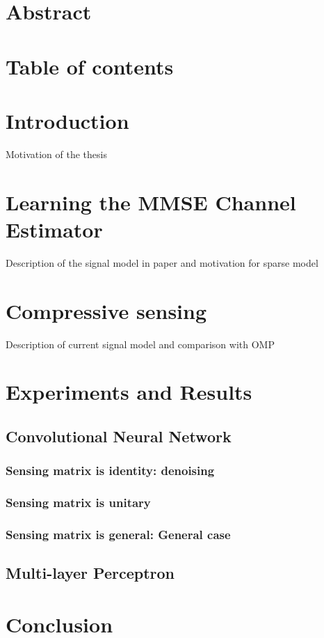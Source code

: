 \documentclass[a4paper,conference]{IEEEtran}
\begin{document}

\section{Abstract}
\section{Table of contents}
\section{Introduction}
Motivation of the thesis
\section{Learning the MMSE Channel Estimator}
Description of the signal model in paper and motivation for sparse model
\section{Compressive sensing}
Description of current signal model and comparison with OMP
\section{Experiments and Results}
\subsection{Convolutional Neural Network}
\subsubsection{Sensing matrix is identity: denoising}
\subsubsection{Sensing matrix is unitary}
\subsubsection{Sensing matrix is general: General case}
\subsection{Multi-layer Perceptron}
\section{Conclusion}
\end{document}
